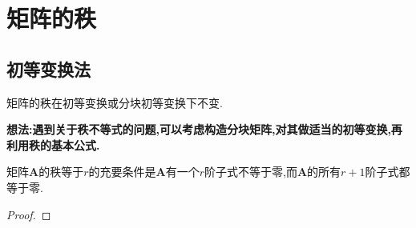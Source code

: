 \documentclass[../../main.tex]{subfiles}
\begin{document}
\everymath{\displaystyle} %

\section{矩阵的秩}

\subsection{初等变换法}

矩阵的秩在初等变换或分块初等变换下不变.

\textbf{想法:遇到关于秩不等式的问题,可以考虑构造分块矩阵,对其做适当的初等变换,再利用秩的基本公式.}

\begin{theorem}\label{theorem:矩阵的秩与子式}
矩阵\(\boldsymbol{A}\)的秩等于\(r\)的充要条件是\(\boldsymbol{A}\)有一个\(r\)阶子式不等于零,而\(\boldsymbol{A}\)的所有\(r + 1\)阶子式都等于零.
\end{theorem}
\begin{proof}

\end{proof}
\end{document}
